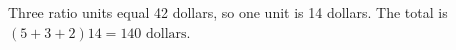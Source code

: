 Three ratio units equal 42 dollars, so one unit is 14 dollars. The total is $(5+3+2)14=\boxed{140\text{ dollars}}$.
